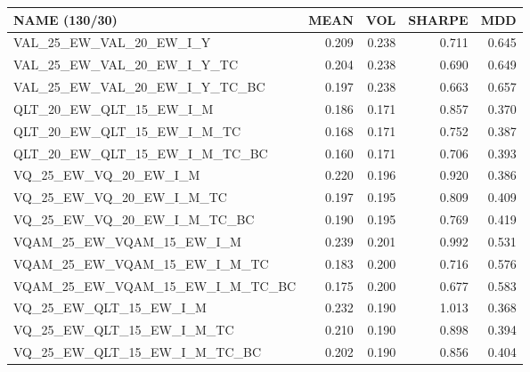 \begin{tabular}{lrrrr}
\toprule
NAME (130/30) & MEAN & VOL & SHARPE & MDD \\
\midrule
VAL\_25\_EW\_VAL\_20\_EW\_I\_Y & 0.209 & 0.238 & 0.711 & 0.645 \\
VAL\_25\_EW\_VAL\_20\_EW\_I\_Y\_TC & 0.204 & 0.238 & 0.690 & 0.649 \\
VAL\_25\_EW\_VAL\_20\_EW\_I\_Y\_TC\_BC & 0.197 & 0.238 & 0.663 & 0.657 \\
QLT\_20\_EW\_QLT\_15\_EW\_I\_M & 0.186 & 0.171 & 0.857 & 0.370 \\
QLT\_20\_EW\_QLT\_15\_EW\_I\_M\_TC & 0.168 & 0.171 & 0.752 & 0.387 \\
QLT\_20\_EW\_QLT\_15\_EW\_I\_M\_TC\_BC & 0.160 & 0.171 & 0.706 & 0.393 \\
VQ\_25\_EW\_VQ\_20\_EW\_I\_M & 0.220 & 0.196 & 0.920 & 0.386 \\
VQ\_25\_EW\_VQ\_20\_EW\_I\_M\_TC & 0.197 & 0.195 & 0.809 & 0.409 \\
VQ\_25\_EW\_VQ\_20\_EW\_I\_M\_TC\_BC & 0.190 & 0.195 & 0.769 & 0.419 \\
VQAM\_25\_EW\_VQAM\_15\_EW\_I\_M & 0.239 & 0.201 & 0.992 & 0.531 \\
VQAM\_25\_EW\_VQAM\_15\_EW\_I\_M\_TC & 0.183 & 0.200 & 0.716 & 0.576 \\
VQAM\_25\_EW\_VQAM\_15\_EW\_I\_M\_TC\_BC & 0.175 & 0.200 & 0.677 & 0.583 \\
VQ\_25\_EW\_QLT\_15\_EW\_I\_M & 0.232 & 0.190 & 1.013 & 0.368 \\
VQ\_25\_EW\_QLT\_15\_EW\_I\_M\_TC & 0.210 & 0.190 & 0.898 & 0.394 \\
VQ\_25\_EW\_QLT\_15\_EW\_I\_M\_TC\_BC & 0.202 & 0.190 & 0.856 & 0.404 \\
\bottomrule
\end{tabular}
